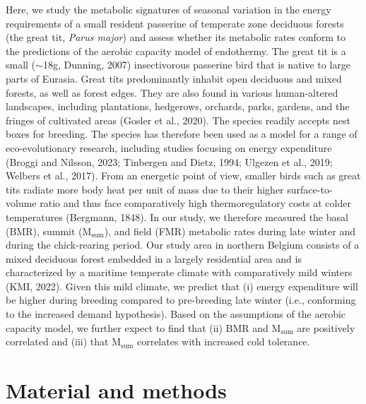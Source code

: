 \documentclass[10pt, twoside]{book} %
\begin{document}
Here, we study the metabolic signatures of seasonal variation in the energy requirements of a small resident passerine of temperate zone deciduous forests (the great tit, \textit{Parus major}) and assess whether its metabolic rates conform to the predictions of the aerobic capacity model of endothermy. The great tit is a small ($\sim$18g, Dunning, 2007) insectivorous passerine bird that is native to large parts of Eurasia. Great tits predominantly inhabit open deciduous and mixed forests, as well as forest edges. They are also found in various human-altered landscapes, including plantations, hedgerows, orchards, parks, gardens, and the fringes of cultivated areas (Gosler et al., 2020). The species readily accepts nest boxes for breeding. The species has therefore been used as a model for a range of eco-evolutionary research, including studies focusing on energy expenditure (Broggi and Nilsson, 2023; Tinbergen and Dietz, 1994; Ulgezen et al., 2019; Welbers et al., 2017). From an energetic point of view, smaller birds such as great tits radiate more body heat per unit of mass due to their higher surface-to-volume ratio and thus face comparatively high thermoregulatory costs at colder temperatures (Bergmann, 1848). In our study, we therefore measured the basal (BMR), summit (M$_{\text{sum}}$), and field (FMR) metabolic rates during late winter and during the chick-rearing period. Our study area in northern Belgium consists of a mixed deciduous forest embedded in a largely residential area and is characterized by a maritime temperate climate with comparatively mild winters (KMI, 2022). Given this mild climate, we predict that (i) energy expenditure will be higher during breeding compared to pre-breeding late winter (i.e., conforming to the increased demand hypothesis). Based on the assumptions of the aerobic capacity model, we further expect to find that (ii) BMR and M$_{\text{sum}}$ are positively correlated and (iii) that M$_{\text{sum}}$ correlates with increased cold tolerance.\\

\section{Material and methods}
\end{document}
